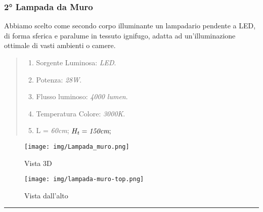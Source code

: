\documentclass[italian, 12pt, a4paper]{article}
\begin{document}
\subsubsection{2° Lampada da Muro}
Abbiamo scelto come secondo corpo illuminante un lampadario pendente a LED, di forma sferica e paralume in tessuto ignifugo, adatta ad un'illuminazione ottimale di vasti ambienti o camere.
\begin{quote}
    \begin{enumerate}
        \item Sorgente Luminosa: \emph{LED}.
        \item Potenza: \emph{28W}.
        \item Flusso luminoso: \emph{4000 lumen}.
        \item Temperatura Colore: \emph{3000K}.
        \item L = \emph{60cm}; $H_t = \emph{150cm};$
    \end{enumerate}
    \vspace{-40pt}
\end{quote}
\begin{figure}[h!]
    \centering
    \begin{minipage}{0.45\textwidth}
        \centering
        \texttt{[image: img/Lampada\_muro.png]} %
        \caption{Vista 3D}
    \end{minipage} \hfill
    \begin{minipage}{0.45\textwidth}
        \centering
        \texttt{[image: img/lampada-muro-top.png]} %
        \caption{Vista dall'alto}
    \end{minipage}
\end{figure}
\hrule
\end{document}
